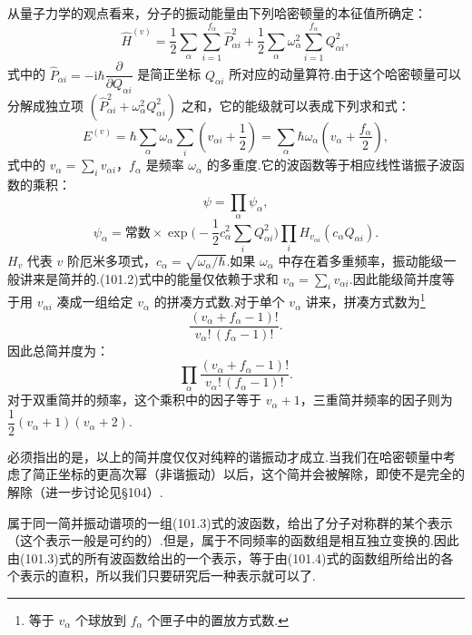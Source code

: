 从量子力学的观点看来，分子的振动能量由下列哈密顿量的本征值所确定：
\begin{equation}
  \hat{H}^{(v)}=\frac{1}{2}\sum_{\alpha}\sum_{i=1}^{f_\alpha}\hat{P}_{\alpha i}^2
  +\frac{1}{2}\sum_{\alpha}\omega_\alpha^2\sum_{i=1}^{f_\alpha}Q_{\alpha i}^2,
\end{equation}
式中的 $\hat{P}_{\alpha i}=-\mathrm{i}\hbar\dfrac{\partial}{\partial Q_{\alpha i}}$ 是简正坐标 $Q_{\alpha i}$ 所对应的动量算符.由于这个哈密顿量可以分解成独立项 $(\hat{P}_{\alpha i}^2+\omega_\alpha^2Q_{\alpha i}^2)$ 之和，它的能级就可以表成下列求和式：
\begin{equation}
  E^{(v)}=\hbar\sum_{\alpha}\omega_\alpha\sum_i\left(v_{\alpha i}+\frac{1}{2}\right)
  =\sum_{\alpha}\hbar\omega_\alpha\left(v_\alpha+\frac{f_\alpha}{2}\right),
\end{equation}
式中的 $v_\alpha=\sum_i v_{\alpha i}$，$f_\alpha$ 是频率 $\omega_\alpha$ 的多重度.它的波函数等于相应线性谐振子波函数的乘积：
\begin{equation}
  \psi=\prod_{\alpha}\psi_\alpha,
\end{equation}
\begin{equation}
  \psi_\alpha=\text{常数}\times
  \exp\Big(-\frac{1}{2}c_\alpha^2\sum_i Q_{\alpha i}^2\Big)
  \prod_i H_{v_{\alpha i}}(c_\alpha Q_{\alpha i}).
\end{equation}
$H_v$ 代表 $v$ 阶厄米多项式，$c_\alpha=\sqrt{\omega_\alpha/\hbar}$.如果 $\omega_\alpha$ 中存在着多重频率，振动能级一般讲来是简并的.(101.2)式中的能量仅依赖于求和 $v_\alpha=\sum_i v_{\alpha i}$.因此能级简并度等于用 $v_{\alpha i}$ 凑成一组给定 $v_\alpha$ 的拼凑方式数.对于单个 $v_\alpha$ 讲来，拼凑方式数为\footnote{等于 $v_\alpha$ 个球放到 $f_\alpha$ 个匣子中的置放方式数.}
\begin{equation*}
  \frac{(v_\alpha+f_\alpha-1)!}{v_\alpha!\,(f_\alpha-1)!}.
\end{equation*}
因此总简并度为：
\begin{equation}
  \prod_{\alpha}\frac{(v_\alpha+f_\alpha-1)!}{v_\alpha!\,(f_\alpha-1)!}.
\end{equation}
对于双重简并的频率，这个乘积中的因子等于 $v_\alpha+1$，三重简并频率的因子则为 $\dfrac{1}{2}(v_\alpha+1)(v_\alpha+2)$.

必须指出的是，以上的简并度仅仅对纯粹的谐振动才成立.当我们在哈密顿量中考虑了简正坐标的更高次幂（非谐振动）以后，这个简并会被解除，即使不是完全的解除（进一步讨论见§104）.

属于同一简并振动谱项的一组(101.3)式的波函数，给出了分子对称群的某个表示（这个表示一般是可约的）.但是，属于不同频率的函数组是相互独立变换的.因此由(101.3)式的所有波函数给出的一个表示，等于由(101.4)式的函数组所给出的各个表示的直积，所以我们只要研究后一种表示就可以了.


